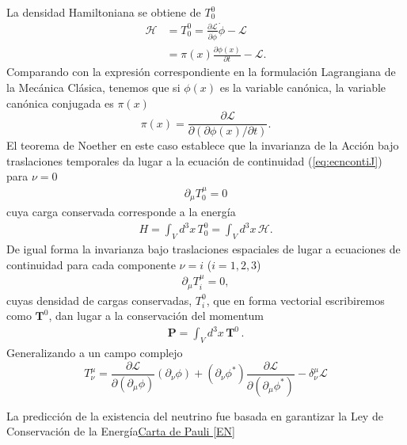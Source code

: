 \begin{frame}
La densidad Hamiltoniana se obtiene de $T^0_0$
\begin{align}
  \label{eq:3}
\mathcal{H}&=T^0_0=\frac{\partial\mathcal{L}}{\partial\dot{\phi}}\dot{\phi}
      -\mathcal{L}\\
      &=\pi(x)\frac{\partial\phi(x)}{\partial t}-\mathcal{L}.
\end{align}
Comparando con la expresión correspondiente en la formulación
Lagrangiana de la Mecánica Clásica, tenemos que si $\phi(x)$ es la
variable canónica, la variable canónica conjugada es $\pi(x)$
\begin{equation}
  \label{eq:4}
  \pi(x)=\frac{\partial\mathcal{L}}{\partial(\partial\phi(x)/\partial t)}.
\end{equation}
El teorema de Noether en este caso establece que la invarianza de la Acción bajo traslaciones temporales da lugar a la ecuación de continuidad (\ref{eq:ecncontiJ}) para $\nu=0$
\begin{align}
\label{eq:122}
  \partial_\mu T^\mu_0=0
\end{align}
cuya carga conservada corresponde a la energía
\begin{align}
  H=\int_V d^3x\, T^0_0=\int_V d^3x\,\mathcal{H}.
\end{align}
De igual forma la invarianza bajo traslaciones espaciales de lugar a ecuaciones de continuidad para cada componente $\nu=i$
 ($i=1,2,3$)
 \begin{align}
   \label{eq:235}
   \partial_\mu T^\mu_i=0,
 \end{align}
cuyas densidad de cargas conservadas, $T^0_i$, que en forma vectorial escribiremos como $\mathbf{T}^0$, dan lugar a la conservación del momentum
\begin{align}
  \mathbf{P}=\int_V d^3x\,\mathbf{T}^0\,.
\end{align}
Generalizando a un campo complejo
\begin{equation}
  \label{eq:138}
     T^\mu_\nu=\frac{\partial\mathcal{L}}{\partial(\partial_\mu\phi)}(\partial_\nu\phi)+(\partial_\nu\phi^*)\frac{\partial\mathcal{L}}{\partial(\partial_\mu\phi^*)}
      -\delta^\mu_\nu\mathcal{L}
\end{equation}

\end{frame}
La predicción de la existencia del neutrino fue basada en garantizar la Ley de Conservación de la Energía\href{https://www.symmetrymagazine.org/sites/default/files/legacy/pdfs/200703/logbook_letter_translation.pdf}{Carta de Pauli [EN]}


